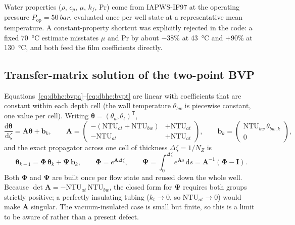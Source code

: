 Water properties ($\rho$, $c_p$, $\mu$, $k_f$, $\mathrm{Pr}$) come from
IAPWS-IF97 at the operating pressure $P_{\mathrm{op}}=\SI{50}{bar}$, evaluated
once per well state at a representative mean temperature. A constant-property
shortcut was explicitly rejected in the code: a fixed \SI{70}{\celsius} estimate
misstates $\mu$ and $\mathrm{Pr}$ by about $-38\%$ at \SI{43}{\celsius} and
$+90\%$ at \SI{130}{\celsius}, and both feed the film coefficients directly.

\subsection{Transfer-matrix solution of the two-point BVP}
\label{sec:dbhe:transfer}

Equations~\eqref{eq:dbhe:bvpa}--\eqref{eq:dbhe:bvpt} are linear with
coefficients that are constant within each depth cell (the wall temperature
$\theta_{bw}$ is piecewise constant, one value per cell). Writing
$\boldsymbol{\theta}=(\theta_a,\theta_t)^{\mathsf T}$,
\begin{equation}
\frac{\mathrm{d}\boldsymbol{\theta}}{\mathrm{d}\zeta}
=\mathbf{A}\boldsymbol{\theta}+\mathbf{b}_k, \qquad \mathbf{A}=\begin{pmatrix}
-\left(\mathrm{NTU}_{at}+\mathrm{NTU}_{bw}\right) & +\mathrm{NTU}_{at}\\[2pt]
-\mathrm{NTU}_{at} & +\mathrm{NTU}_{at} \end{pmatrix}, \qquad
\mathbf{b}_k=\begin{pmatrix}\mathrm{NTU}_{bw}\,\theta_{bw,k}\\[2pt]
0\end{pmatrix},
\label{eq:dbhe:Amatrix}
\end{equation}
and the exact propagator across one cell of thickness $\Delta\zeta=1/N_Z$ is
\begin{equation}
\boldsymbol{\theta}_{k+1}=\boldsymbol{\Phi}\,\boldsymbol{\theta}_{k}
+\boldsymbol{\Psi}\,\mathbf{b}_k, \qquad \boldsymbol{\Phi}=e^{\mathbf{A}\Delta\zeta}, \qquad
\boldsymbol{\Psi}=\int_0^{\Delta\zeta}\!e^{\mathbf{A}s}\,\mathrm{d}s
=\mathbf{A}^{-1}\left(\boldsymbol{\Phi}-\mathbf{I}\right).
\label{eq:dbhe:PhiPsi}
\end{equation}
Both $\boldsymbol{\Phi}$ and $\boldsymbol{\Psi}$ are built once per flow state
and reused down the whole well. Because $\det\mathbf{A}=-\mathrm{NTU}_{at}\,
\mathrm{NTU}_{bw}$, the closed form for $\boldsymbol{\Psi}$ requires both
groups strictly positive; a perfectly insulating tubing ($k_t\to0$, so
$\mathrm{NTU}_{at}\to0$) would make $\mathbf{A}$ singular. The vacuum-insulated
case is small but finite, so this is a limit to be aware of rather than a
present defect.

